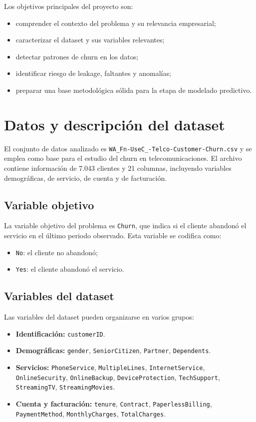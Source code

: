 \documentclass[conference]{IEEEtran}
\begin{document}
Los objetivos principales del proyecto son:
\begin{itemize}[leftmargin=*]
 \item comprender el contexto del problema y su relevancia empresarial;
 \item caracterizar el dataset y sus variables relevantes;
 \item detectar patrones de churn en los datos;
 \item identificar riesgo de leakage, faltantes y anomalías;
 \item preparar una base metodológica sólida para la etapa de modelado predictivo.
\end{itemize}

\section{Datos y descripción del dataset}
El conjunto de datos analizado es \texttt{WA\_Fn-UseC\_-Telco-Customer-Churn.csv} y se emplea como base para el estudio del churn en telecomunicaciones. El archivo contiene información de 7.043 clientes y 21 columnas, incluyendo variables demográficas, de servicio, de cuenta y de facturación.

\subsection{Variable objetivo}
La variable objetivo del problema es \texttt{Churn}, que indica si el cliente abandonó el servicio en el último periodo observado. Esta variable se codifica como:
\begin{itemize}[leftmargin=*]
 \item \texttt{No}: el cliente no abandonó;
 \item \texttt{Yes}: el cliente abandonó el servicio.
\end{itemize}

\subsection{Variables del dataset}
Las variables del dataset pueden organizarse en varios grupos:

\begin{itemize}[leftmargin=*]
 \item \textbf{Identificación:} \texttt{customerID}.
 \item \textbf{Demográficas:} \texttt{gender}, \texttt{SeniorCitizen}, \texttt{Partner}, \texttt{Dependents}.
 \item \textbf{Servicios:} \texttt{PhoneService}, \texttt{MultipleLines}, \texttt{InternetService}, \texttt{OnlineSecurity}, \texttt{OnlineBackup}, \texttt{DeviceProtection}, \texttt{TechSupport}, \texttt{StreamingTV}, \texttt{StreamingMovies}.
 \item \textbf{Cuenta y facturación:} \texttt{tenure}, \texttt{Contract}, \texttt{PaperlessBilling}, \texttt{PaymentMethod}, \texttt{MonthlyCharges}, \texttt{TotalCharges}.
\end{itemize}
\end{document}
